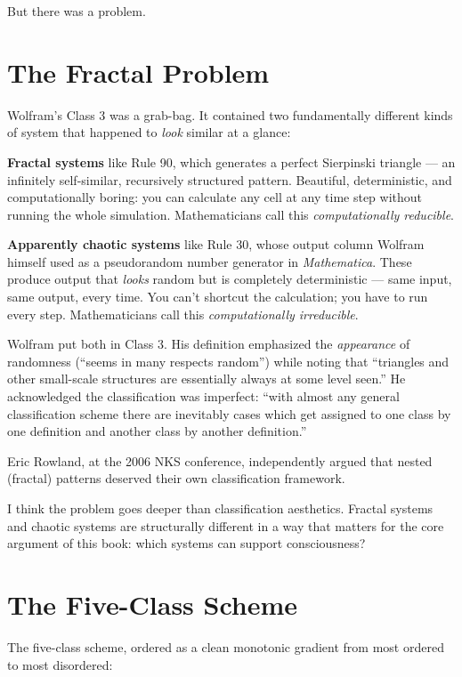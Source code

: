 \documentclass[11pt, twoside, openright]{book}
\begin{document}
But there was a problem.

\section*{The Fractal Problem}

Wolfram's Class 3 was a grab-bag. It contained two fundamentally different kinds of system that happened to \textit{look} similar at a glance:

\textbf{Fractal systems} like Rule 90, which generates a perfect Sierpinski triangle --- an infinitely self-similar, recursively structured pattern. Beautiful, deterministic, and computationally boring: you can calculate any cell at any time step without running the whole simulation. Mathematicians call this \textit{computationally reducible}.

\textbf{Apparently chaotic systems} like Rule 30, whose output column Wolfram himself used as a pseudorandom number generator in \textit{Mathematica}. These produce output that \textit{looks} random but is completely deterministic --- same input, same output, every time. You can't shortcut the calculation; you have to run every step. Mathematicians call this \textit{computationally irreducible}.

Wolfram put both in Class 3. His definition emphasized the \textit{appearance} of randomness (``seems in many respects random'') while noting that ``triangles and other small-scale structures are essentially always at some level seen.'' He acknowledged the classification was imperfect: ``with almost any general classification scheme there are inevitably cases which get assigned to one class by one definition and another class by another definition.''

Eric Rowland, at the 2006 NKS conference, independently argued that nested (fractal) patterns deserved their own classification framework.

I think the problem goes deeper than classification aesthetics. Fractal systems and chaotic systems are structurally different in a way that matters for the core argument of this book: which systems can support consciousness?

\section*{The Five-Class Scheme}

The five-class scheme, ordered as a clean monotonic gradient from most ordered to most disordered:
\end{document}
